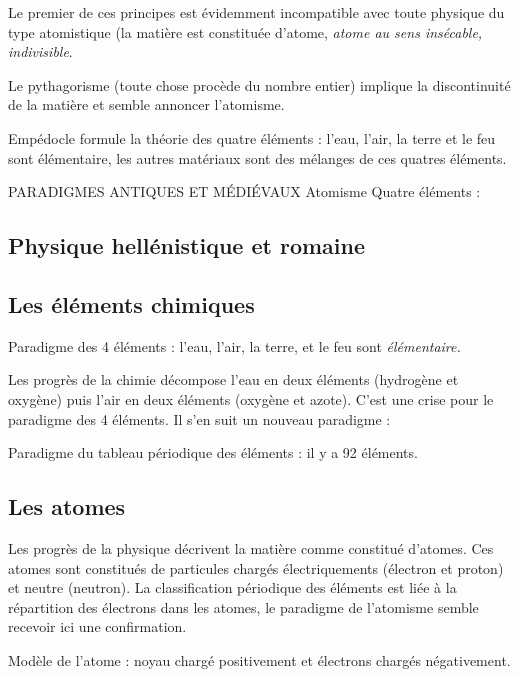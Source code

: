 Le premier de ces principes est évidemment incompatible avec toute physique du type atomistique (la matière est constituée d'atome, {\it atome au sens insécable, indivisible}.

Le pythagorisme (toute chose procède du nombre entier) implique la discontinuité de la matière et semble annoncer l'atomisme.

Empédocle formule la théorie des quatre éléments : l'eau, l'air, la terre et le feu sont élémentaire, les autres matériaux sont des mélanges de ces quatres éléments.

\begin{comment}
\item Platon : les éléments derniers de la matière sont les corps simples.
\end{comment}

PARADIGMES ANTIQUES ET MÉDIÉVAUX
	Atomisme
	Quatre éléments : 

\subsection{Physique hellénistique et romaine}

\subsection{Les éléments chimiques}
\begin{center}
Paradigme des 4 éléments : l'eau, l'air, la terre, et le feu sont \it{élémentaire}.
\end{center}

Les progrès de la chimie décompose l'eau en deux éléments (hydrogène et oxygène) puis l'air en deux éléments (oxygène et azote). C'est une crise pour le paradigme des 4 éléments. Il s'en suit un nouveau paradigme :

\begin{center}
Paradigme du tableau périodique des éléments : il y a 92 éléments.
\end{center}

\subsection{Les atomes}

Les progrès de la physique décrivent la matière comme constitué d'atomes. Ces atomes sont constitués de particules chargés électriquements (électron et proton) et neutre (neutron). La classification périodique des éléments est liée à la répartition des électrons dans les atomes, le paradigme de l'atomisme semble recevoir ici une confirmation.
\begin{center}
Modèle de l'atome : noyau chargé positivement et électrons chargés négativement.
\end{center}

